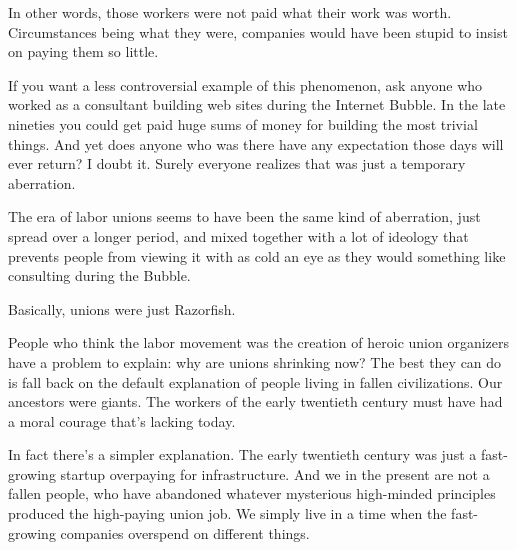 In other words, those workers were not
                  paid what their work was worth. Circumstances being what they
                  were, companies would have been stupid to insist on paying
                  them so little.

If you want a less controversial
                  example of this phenomenon, ask anyone who worked as a
                  consultant building web sites during the Internet Bubble. In
                  the late nineties you could get paid huge sums of money for
                  building the most trivial things. And yet does anyone who was
                  there have any expectation those days will ever return? I
                  doubt it. Surely everyone realizes that was just a temporary
                  aberration.

The era of labor unions seems to have
                  been the same kind of aberration, just spread over a longer
                  period, and mixed together with a lot of ideology that
                  prevents people from viewing it with as cold an eye as they
                  would something like consulting during the Bubble.

Basically,
                  unions were just Razorfish.

People who think the
                  labor movement was the creation of heroic union organizers
                  have a problem to explain: why are unions shrinking now? The
                  best they can do is fall back on the default explanation of
                  people living in fallen civilizations. Our ancestors were
                  giants. The workers of the early twentieth century must have
                  had a moral courage that's lacking today.

In fact
                  there's a simpler explanation. The early twentieth century was
                  just a fast-growing startup overpaying for infrastructure. And
                  we in the present are not a fallen people, who have abandoned
                  whatever mysterious high-minded principles produced the
                  high-paying union job. We simply live in a time when the
                  fast-growing companies overspend on different things.



              
            
          
            
              
                


                  
              
            
          
